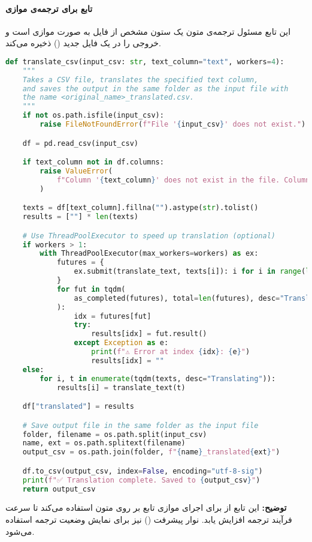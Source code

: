 \documentclass{article}
\begin{document}
\paragraph{تابع  برای ترجمه‌ی موازی}

این تابع مسئول ترجمه‌ی متون یک ستون مشخص از فایل  به صورت موازی است و خروجی را در یک فایل جدید () ذخیره می‌کند.

\begin{latin}
\begin{lstlisting}[language=Python]
def translate_csv(input_csv: str, text_column="text", workers=4):
    """
    Takes a CSV file, translates the specified text column,
    and saves the output in the same folder as the input file with
    the name <original_name>_translated.csv.
    """
    if not os.path.isfile(input_csv):
        raise FileNotFoundError(f"File '{input_csv}' does not exist.")

    df = pd.read_csv(input_csv)

    if text_column not in df.columns:
        raise ValueError(
            f"Column '{text_column}' does not exist in the file. Columns: {df.columns.tolist()}"
        )

    texts = df[text_column].fillna("").astype(str).tolist()
    results = [""] * len(texts)

    # Use ThreadPoolExecutor to speed up translation (optional)
    if workers > 1:
        with ThreadPoolExecutor(max_workers=workers) as ex:
            futures = {
                ex.submit(translate_text, texts[i]): i for i in range(len(texts))
            }
            for fut in tqdm(
                as_completed(futures), total=len(futures), desc="Translating"
            ):
                idx = futures[fut]
                try:
                    results[idx] = fut.result()
                except Exception as e:
                    print(f"⚠️ Error at index {idx}: {e}")
                    results[idx] = ""
    else:
        for i, t in enumerate(tqdm(texts, desc="Translating")):
            results[i] = translate_text(t)

    df["translated"] = results

    # Save output file in the same folder as the input file
    folder, filename = os.path.split(input_csv)
    name, ext = os.path.splitext(filename)
    output_csv = os.path.join(folder, f"{name}_translated{ext}")

    df.to_csv(output_csv, index=False, encoding="utf-8-sig")
    print(f"✅ Translation complete. Saved to {output_csv}")
    return output_csv
\end{lstlisting}
\end{latin}
\textbf{توضیح:} این تابع از  برای اجرای موازی تابع  بر روی متون استفاده می‌کند تا سرعت فرآیند ترجمه افزایش یابد. نوار پیشرفت () نیز برای نمایش وضعیت ترجمه استفاده می‌شود.
\end{document}
